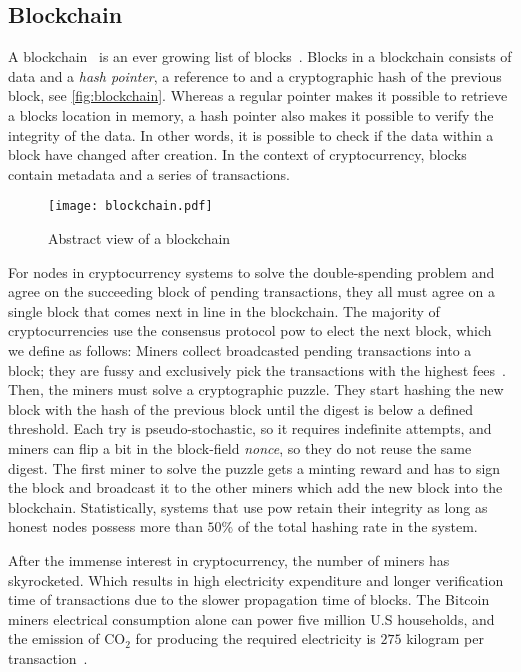 \subsection{Blockchain}\label{sec:blockchain}
A blockchain~\cite{bitcoin_book} is an ever growing list of blocks~\cite{bitcoin_book}. Blocks in a blockchain consists of data and a \emph{hash pointer}, a reference to and a cryptographic hash of the previous block, see \autoref{fig:blockchain}. Whereas a regular pointer makes it possible to retrieve a blocks location in memory, a hash pointer also makes it possible to verify the integrity of the data. In other words, it is possible to check if the data within a block have changed after creation. In the context of cryptocurrency, blocks contain metadata and a series of transactions.

\begin{figure}[ht]
    \texttt{[image: blockchain.pdf]}
    \caption{Abstract view of a blockchain}
    \label{fig:blockchain}
\end{figure}

For nodes in cryptocurrency systems to solve the double-spending problem and agree on the succeeding block of pending transactions, they all must agree on a single block that comes next in line in the blockchain. The majority of cryptocurrencies use the consensus protocol \ac{pow} to elect the next block, which we define as follows: Miners collect broadcasted pending transactions into a block; they are fussy and exclusively pick the transactions with the highest fees~\cite{trends_fee, trans_fee}. Then, the miners must solve a cryptographic puzzle. They start hashing the new block with the hash of the previous block until the digest is below a defined threshold. Each try is pseudo-stochastic, so it requires indefinite attempts, and miners can flip a bit in the block-field \emph{nonce}, so they do not reuse the same digest. The first miner to solve the puzzle gets a minting reward and has to sign the block and broadcast it to the other miners which add the new block into the blockchain. Statistically, systems that use \ac{pow} retain their integrity as long as honest nodes possess more than $50\%$ of the total hashing rate in the system.

After the immense interest in cryptocurrency, the number of miners has skyrocketed. Which results in high electricity expenditure and longer verification time of transactions due to the slower propagation time of blocks. The Bitcoin miners electrical consumption alone can power five million U.S households, and the emission of CO$_2$ for producing the required electricity is $275$ kilogram per transaction~\cite{bitcoin_power}.

